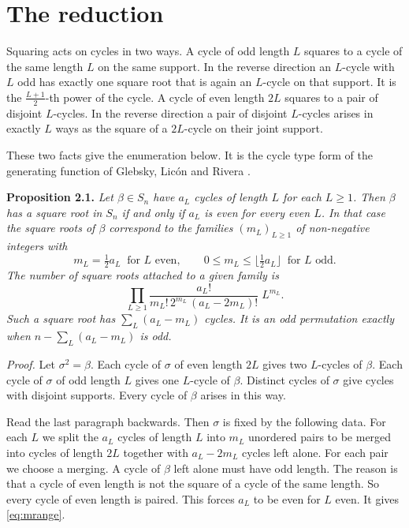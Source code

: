 \documentclass[10pt]{article}
\begin{document}
\section{The reduction}\label{sec:reduction}

Squaring acts on cycles in two ways. A cycle of odd length $L$ squares to a cycle of the
same length $L$ on the same support. In the reverse direction an $L$-cycle with $L$ odd has
exactly one square root that is again an $L$-cycle on that support. It is the
$\tfrac{L+1}{2}$-th power of the cycle. A cycle of even length $2L$ squares to a pair of
disjoint $L$-cycles. In the reverse direction a pair of disjoint $L$-cycles arises in exactly
$L$ ways as the square of a $2L$-cycle on their joint support.

These two facts give the enumeration below. It is the cycle type form of the generating
function of Glebsky, Lic\'on and Rivera \cite{GLR2023}.

\medskip\noindent
\textbf{Proposition 2.1.} \emph{Let $\beta\in S_n$ have $a_L$ cycles of length $L$ for each
$L\ge1$. Then $\beta$ has a square root in $S_n$ if and only if $a_L$ is even for every even
$L$. In that case the square roots of $\beta$ correspond to the families
$(m_L)_{L\ge1}$ of non-negative integers with}
\begin{equation}\label{eq:mrange}
  m_L=\tfrac{1}{2}a_L\ \text{ for $L$ even},\qquad 0\le m_L\le\bigl\lfloor\tfrac{1}{2}a_L\bigr\rfloor
  \ \text{ for $L$ odd}.
\end{equation}
\emph{The number of square roots attached to a given family is}
\begin{equation}\label{eq:rootcount}
  \prod_{L\ge1}\frac{a_L!}{m_L!\,2^{m_L}\,(a_L-2m_L)!}\;L^{m_L}.
\end{equation}
\emph{Such a square root has $\sum_L(a_L-m_L)$ cycles. It is an odd permutation exactly when
$n-\sum_L(a_L-m_L)$ is odd.}

\medskip\noindent
\textit{Proof.} Let $\sigma^{2}=\beta$. Each cycle of $\sigma$ of even length $2L$ gives two
$L$-cycles of $\beta$. Each cycle of $\sigma$ of odd length $L$ gives one $L$-cycle of
$\beta$. Distinct cycles of $\sigma$ give cycles with disjoint supports. Every cycle of
$\beta$ arises in this way.

Read the last paragraph backwards. Then $\sigma$ is fixed by the following data. For each
$L$ we split the $a_L$ cycles of length $L$ into $m_L$ unordered pairs to be merged into
cycles of length $2L$ together with $a_L-2m_L$ cycles left alone. For each pair we choose a
merging. A cycle of $\beta$ left alone must have odd length. The reason is that a cycle of
even length is not the square of a cycle of the same length. So every cycle of even length
is paired. This forces $a_L$ to be even for $L$ even. It gives \eqref{eq:mrange}.
\end{document}
